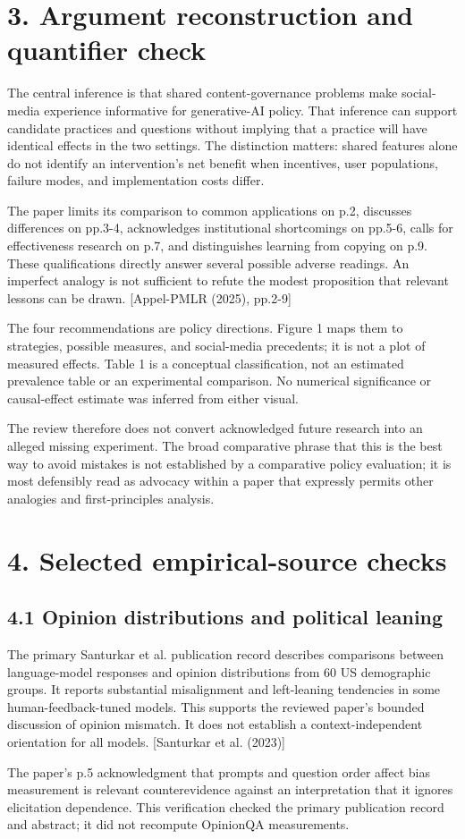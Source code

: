 \documentclass[10pt]{article}
\begin{document}
\section*{3. Argument reconstruction and quantifier check}
The central inference is that shared content-governance problems make social-media experience informative for generative-AI policy. That inference can support candidate practices and questions without implying that a practice will have identical effects in the two settings. The distinction matters: shared features alone do not identify an intervention’s net benefit when incentives, user populations, failure modes, and implementation costs differ.\par
The paper limits its comparison to common applications on p.2, discusses differences on pp.3-4, acknowledges institutional shortcomings on pp.5-6, calls for effectiveness research on p.7, and distinguishes learning from copying on p.9. These qualifications directly answer several possible adverse readings. An imperfect analogy is not sufficient to refute the modest proposition that relevant lessons can be drawn. [Appel-PMLR (2025), pp.2-9]\par
The four recommendations are policy directions. Figure 1 maps them to strategies, possible measures, and social-media precedents; it is not a plot of measured effects. Table 1 is a conceptual classification, not an estimated prevalence table or an experimental comparison. No numerical significance or causal-effect estimate was inferred from either visual.\par
The review therefore does not convert acknowledged future research into an alleged missing experiment. The broad comparative phrase that this is the best way to avoid mistakes is not established by a comparative policy evaluation; it is most defensibly read as advocacy within a paper that expressly permits other analogies and first-principles analysis.\par
\section*{4. Selected empirical-source checks}
\subsection*{4.1 Opinion distributions and political leaning}
The primary Santurkar et al. publication record describes comparisons between language-model responses and opinion distributions from 60 US demographic groups. It reports substantial misalignment and left-leaning tendencies in some human-feedback-tuned models. This supports the reviewed paper’s bounded discussion of opinion mismatch. It does not establish a context-independent orientation for all models. [Santurkar et al. (2023)]\par
The paper’s p.5 acknowledgment that prompts and question order affect bias measurement is relevant counterevidence against an interpretation that it ignores elicitation dependence. This verification checked the primary publication record and abstract; it did not recompute OpinionQA measurements.\par
\end{document}
